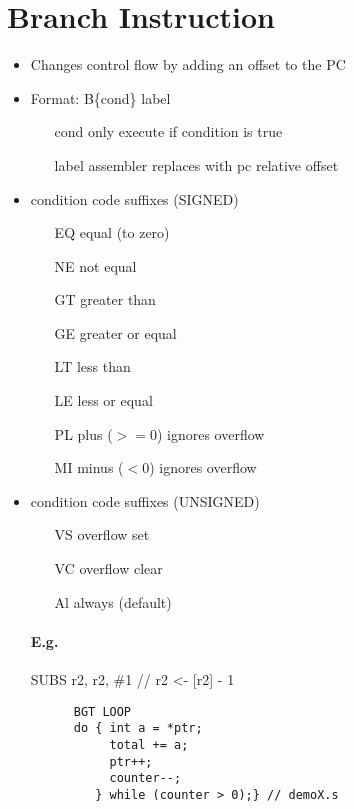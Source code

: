 \section{Branch Instruction}
  \begin{itemize}
    \item Changes control flow by adding an offset to the PC
    \item Format: B\{cond\} label
    \begin{itemize}
      \item[cond] only execute if condition is true
      \item[label] assembler replaces with pc relative offset
    \end{itemize}
    \item condition code suffixes (SIGNED)
    \begin{itemize}
      \item[EQ] equal (to zero)
      \item[NE] not equal
      \item[GT] greater than
      \item[GE] greater or equal
      \item[LT] less than
      \item[LE] less or equal
      \item[PL] plus ($>= 0$) ignores overflow
      \item[MI] minus ($<0$) ignores overflow
    \end{itemize}
    \item condition code suffixes (UNSIGNED)
    \begin{itemize}
      \item[VS] overflow set
      \item[VC] overflow clear
      \item[Al] always (default)
    \end{itemize}

    \paragraph{E.g.} SUBS r2, r2, \#1 // r2 <- [r2] - 1
    \begin{lstlisting}
      BGT LOOP
      do { int a = *ptr;
           total += a;
           ptr++;
           counter--;
         } while (counter > 0);} // demoX.s
    \end{lstlisting}
  \end{itemize}

